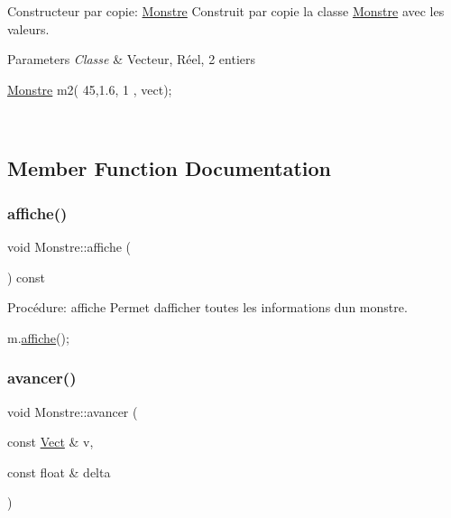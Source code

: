 Constructeur par copie\+: \hyperlink{classMonstre}{Monstre} Construit par copie la classe \hyperlink{classMonstre}{Monstre} avec les valeurs. 


\begin{DoxyParams}{Parameters}
{\em Classe} & Vecteur, Réel, 2 entiers 
\begin{DoxyCode}
\hyperlink{classMonstre}{Monstre} m2(  45,1.6, 1 , vect);
\end{DoxyCode}
 \\
\hline
\end{DoxyParams}


\subsection{Member Function Documentation}
\mbox{\label{classMonstre_ad6fe422be19d7989676ef0707924c8f9}} 
\subsubsection{\texorpdfstring{affiche()}{affiche()}}
{\footnotesize\ttfamily void Monstre\+::affiche (\begin{DoxyParamCaption}{ }\end{DoxyParamCaption}) const}



Procédure\+: affiche Permet d\textquotesingle{}afficher toutes les informations d\textquotesingle{}un monstre. 


\begin{DoxyCode}
m.\hyperlink{classMonstre_ad6fe422be19d7989676ef0707924c8f9}{affiche}();
\end{DoxyCode}
 \mbox{\label{classMonstre_ac8c771a6d9f612716b917688df56905f}} 
\subsubsection{\texorpdfstring{avancer()}{avancer()}}
{\footnotesize\ttfamily void Monstre\+::avancer (\begin{DoxyParamCaption}\item[{const \hyperlink{classVect}{Vect} \&}]{v,  }\item[{const float \&}]{delta }\end{DoxyParamCaption})}




